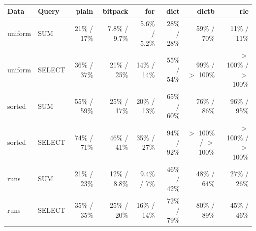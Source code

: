 \begin{tabular}{llrrrrrr}
\toprule
Data & Query & plain & bitpack & for & dict & dictb & rle \\
\midrule
uniform & SUM & 21\% / 17\% & 7.8\% / 9.7\% & 5.6\% / 5.2\% & 28\% / 28\% & 59\% / 70\% & 11\% / 11\% \\
uniform & SELECT & 36\% / 37\% & 21\% / 25\% & 14\% / 14\% & 55\% / 54\% & 99\% / $>$ 100\% & $>$ 100\% / $>$ 100\% \\
sorted & SUM & 55\% / 59\% & 25\% / 17\% & 20\% / 13\% & 65\% / 60\% & 76\% / 86\% & 96\% / 95\% \\
sorted & SELECT & 74\% / 71\% & 46\% / 41\% & 35\% / 27\% & 94\% / 92\% & $>$ 100\% / $>$ 100\% & $>$ 100\% / $>$ 100\% \\
runs & SUM & 21\% / 23\% & 12\% / 8.8\% & 9.4\% / 7\% & 46\% / 42\% & 48\% / 64\% & 27\% / 26\% \\
runs & SELECT & 35\% / 35\% & 25\% / 20\% & 16\% / 14\% & 72\% / 79\% & 80\% / 89\% & 45\% / 46\% \\
\bottomrule
\end{tabular}
